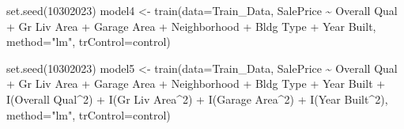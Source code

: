 \documentclass[
  letterpaper,
  DIV=11,
  numbers=noendperiod]{scrreprt}
\newenvironment{Shaded}{\begin{snugshade}}{\end{snugshade}}
\newcommand{\AttributeTok}[1]{\textcolor[rgb]{0.40,0.45,0.13}{#1}}
\newcommand{\DecValTok}[1]{\textcolor[rgb]{0.68,0.00,0.00}{#1}}
\newcommand{\FunctionTok}[1]{\textcolor[rgb]{0.28,0.35,0.67}{#1}}
\newcommand{\NormalTok}[1]{\textcolor[rgb]{0.00,0.23,0.31}{#1}}
\newcommand{\OtherTok}[1]{\textcolor[rgb]{0.00,0.23,0.31}{#1}}
\newcommand{\SpecialCharTok}[1]{\textcolor[rgb]{0.37,0.37,0.37}{#1}}
\newcommand{\StringTok}[1]{\textcolor[rgb]{0.13,0.47,0.30}{#1}}
\begin{document}
\begin{Shaded}
\begin{Highlighting}[]
\FunctionTok{set.seed}\NormalTok{(}\DecValTok{10302023}\NormalTok{) }
\NormalTok{model4 }\OtherTok{\textless{}{-}} \FunctionTok{train}\NormalTok{(}\AttributeTok{data=}\NormalTok{Train\_Data, SalePrice }\SpecialCharTok{\textasciitilde{}} \StringTok{\textasciigrave{}}\AttributeTok{Overall Qual}\StringTok{\textasciigrave{}} 
                \SpecialCharTok{+} \StringTok{\textasciigrave{}}\AttributeTok{Gr Liv Area}\StringTok{\textasciigrave{}}  \SpecialCharTok{+} \StringTok{\textasciigrave{}}\AttributeTok{Garage Area}\StringTok{\textasciigrave{}} 
                \SpecialCharTok{+} \StringTok{\textasciigrave{}}\AttributeTok{Neighborhood}\StringTok{\textasciigrave{}} \SpecialCharTok{+} \StringTok{\textasciigrave{}}\AttributeTok{Bldg Type}\StringTok{\textasciigrave{}} \SpecialCharTok{+} \StringTok{\textasciigrave{}}\AttributeTok{Year Built}\StringTok{\textasciigrave{}}\NormalTok{,  }
                \AttributeTok{method=}\StringTok{"lm"}\NormalTok{, }\AttributeTok{trControl=}\NormalTok{control)}

\FunctionTok{set.seed}\NormalTok{(}\DecValTok{10302023}\NormalTok{) }
\NormalTok{model5 }\OtherTok{\textless{}{-}} \FunctionTok{train}\NormalTok{(}\AttributeTok{data=}\NormalTok{Train\_Data, SalePrice }\SpecialCharTok{\textasciitilde{}} \StringTok{\textasciigrave{}}\AttributeTok{Overall Qual}\StringTok{\textasciigrave{}} \SpecialCharTok{+} 
                  \StringTok{\textasciigrave{}}\AttributeTok{Gr Liv Area}\StringTok{\textasciigrave{}} \SpecialCharTok{+} \StringTok{\textasciigrave{}}\AttributeTok{Garage Area}\StringTok{\textasciigrave{}} \SpecialCharTok{+} \StringTok{\textasciigrave{}}\AttributeTok{Neighborhood}\StringTok{\textasciigrave{}} \SpecialCharTok{+} 
                  \StringTok{\textasciigrave{}}\AttributeTok{Bldg Type}\StringTok{\textasciigrave{}} \SpecialCharTok{+} \StringTok{\textasciigrave{}}\AttributeTok{Year Built}\StringTok{\textasciigrave{}} \SpecialCharTok{+} \FunctionTok{I}\NormalTok{(}\StringTok{\textasciigrave{}}\AttributeTok{Overall Qual}\StringTok{\textasciigrave{}}\SpecialCharTok{\^{}}\DecValTok{2}\NormalTok{) }\SpecialCharTok{+} 
                  \FunctionTok{I}\NormalTok{(}\StringTok{\textasciigrave{}}\AttributeTok{Gr Liv Area}\StringTok{\textasciigrave{}}\SpecialCharTok{\^{}}\DecValTok{2}\NormalTok{) }\SpecialCharTok{+} \FunctionTok{I}\NormalTok{(}\StringTok{\textasciigrave{}}\AttributeTok{Garage Area}\StringTok{\textasciigrave{}}\SpecialCharTok{\^{}}\DecValTok{2}\NormalTok{) }\SpecialCharTok{+} 
                  \FunctionTok{I}\NormalTok{(}\StringTok{\textasciigrave{}}\AttributeTok{Year Built}\StringTok{\textasciigrave{}}\SpecialCharTok{\^{}}\DecValTok{2}\NormalTok{),  }\AttributeTok{method=}\StringTok{"lm"}\NormalTok{, }\AttributeTok{trControl=}\NormalTok{control)}


\end{Highlighting}
\end{Shaded}
\end{document}
